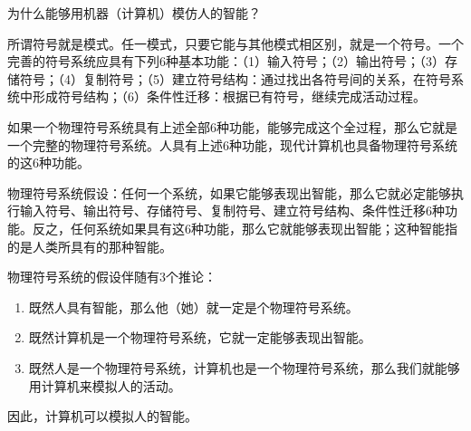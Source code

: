 \begin{question}
为什么能够用机器（计算机）模仿人的智能？
\end{question}
\begin{solution}
所谓符号就是模式。任一模式，只要它能与其他模式相区别，就是一个符号。一个完善的符号系统应具有下列6种基本功能：（1）输入符号；（2）输出符号；（3）存储符号；（4）复制符号；（5）建立符号结构：通过找出各符号间的关系，在符号系统中形成符号结构；（6）条件性迁移：根据已有符号，继续完成活动过程。\par
如果一个物理符号系统具有上述全部6种功能，能够完成这个全过程，那么它就是一个完整的物理符号系统。人具有上述6种功能，现代计算机也具备物理符号系统的这6种功能。\par
物理符号系统假设：任何一个系统，如果它能够表现出智能，那么它就必定能够执行输入符号、输出符号、存储符号、复制符号、建立符号结构、条件性迁移6种功能。反之，任何系统如果具有这6种功能，那么它就能够表现出智能；这种智能指的是人类所具有的那种智能。\par
物理符号系统的假设伴随有3个推论：\par
	\begin{enumerate}
		\item 既然人具有智能，那么他（她）就一定是个物理符号系统。
		\item 既然计算机是一个物理符号系统，它就一定能够表现出智能。
		\item 既然人是一个物理符号系统，计算机也是一个物理符号系统，那么我们就能够用计算机来模拟人的活动。
	\end{enumerate} \par
因此，计算机可以模拟人的智能。
\end{solution}

